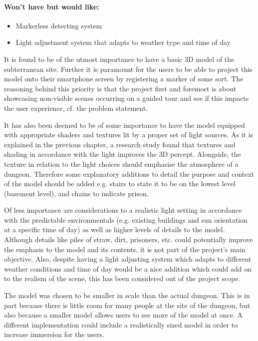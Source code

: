 \paragraph{Won’t have but would like:}
\begin{itemize}
\item Markerless detecting system
\item Light adjustment system that adapts to weather type and time of day
\end{itemize}

It is found to be of the utmost importance to have a basic 3D model of the subterranean site. Further it is paramount for the users to be able to project this model onto their smartphone screen by registering a marker of some sort. The reasoning behind this priority is that the project first and foremost is about showcasing non-visible scenes occurring on a guided tour and see if this impacts the user experience, cf. the problem statement. 

It has also been deemed to be of some importance to have the model equipped with appropriate shaders and textures lit by a proper set of light sources. As it is explained in the previous chapter, a research study found that textures and shading in accordance with the light improves the 3D percept. Alongside, the texture in relation to the light choices should emphasise the atmosphere of a dungeon. Therefore some explanatory additions to detail the purpose and context of the model should be added e.g. stairs to state it to be on the lowest level (basement level), and chains to indicate prison. 

Of less importance are considerations to a realistic light setting in accordance with the predictable environmentals (e.g. existing buildings and sun orientation at a specific time of day) as well as higher levels of details to the model. Although details like piles of straw, dirt, prisoners, etc. could potentially improve the emphasis to the model and its contents, it is not part of the project’s main objective. Also, despite having a light adjusting system which adapts to different weather conditions and time of day would be a nice addition which could add on to the realism of the scene, this has been considered out of the project scope. 

The model was chosen to be smaller in scale than the actual dungeon. This is in part because there is little room for many people at the site of the dungeon, but also because a smaller model allows users to see more of the model at once. A different implementation could include a realistically sized model in order to increase immersion for the users.

